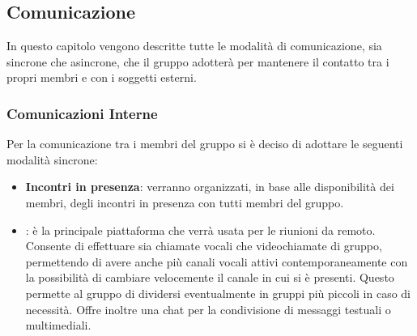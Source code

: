 \documentclass[a4paper,12pt]{article}
\begin{document}
\subsection{Comunicazione}
In questo capitolo vengono descritte tutte le modalità di comunicazione, sia sincrone che asincrone, che il gruppo adotterà per mantenere il contatto tra i propri membri e con i soggetti esterni.


\subsubsection{Comunicazioni Interne}
Per la comunicazione tra i membri del gruppo si è deciso di adottare le seguenti modalità sincrone:

\begin{itemize}
    \item \textbf{Incontri in presenza}: verranno organizzati, in base alle disponibilità dei membri, degli incontri in presenza con tutti membri del gruppo.

    \item \textbf{\underline{}}: è la principale piattaforma che verrà usata per le riunioni da remoto. Consente di effettuare sia chiamate vocali che videochiamate di gruppo, permettendo di avere anche più canali vocali attivi contemporaneamente con la possibilità di cambiare velocemente il canale in cui si è presenti. Questo permette al gruppo di dividersi eventualmente in gruppi più piccoli in caso di necessità. Offre inoltre una chat per la condivisione di messaggi testuali o multimediali.
\end{itemize}
\end{document}

